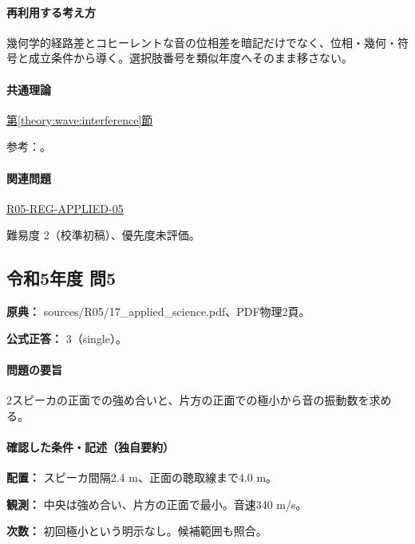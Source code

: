 \paragraph{再利用する考え方} 幾何学的経路差とコヒーレントな音の位相差を暗記だけでなく、位相・幾何・符号と成立条件から導く。選択肢番号を類似年度へそのまま移さない。

\paragraph{共通理論} \hyperref[theory:wave:interference]{第\ref*{theory:wave:interference}節}

\par 参考：\cite{os_superposition}。

\paragraph{関連問題} \hyperref[q:r05-reg-applied-05]{R05-REG-APPLIED-05}

\par 難易度 2（校準初稿）、優先度未評価。

\subsection{令和5年度 問5}
\label{q:r05-reg-applied-05}

\noindent\textbf{原典：} sources/R05/17\_applied\_science.pdf、PDF物理2頁。

\textbf{公式正答：} 3（single）。

\paragraph{問題の要旨} 2スピーカの正面での強め合いと、片方の正面での極小から音の振動数を求める。

\paragraph{確認した条件・記述（独自要約）}\mbox{}\par

\noindent\textbf{配置：} スピーカ間隔2.4 m、正面の聴取線まで4.0 m。\par

\noindent\textbf{観測：} 中央は強め合い、片方の正面で最小。音速340 m/s。\par

\noindent\textbf{次数：} 初回極小という明示なし。候補範囲も照合。\par

